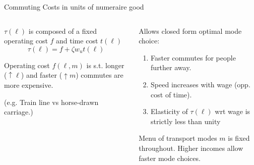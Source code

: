\documentclass[aspectratio=169]{beamer}
\begin{document}
\begin{frame}{Commuting Costs in units of numeraire good}

\begin{columns}
\begin{column}{0.5\textwidth}
\begin{midi}
\item $\tau(\ell)$ is composed of a fixed operating cost $f$ and time cost $t(\ell)$
\begin{equation*}
\tau(\ell) = f + \zeta w_u t(\ell)
\end{equation*}
\item Operating cost $f(\ell,m)$ is s.t. longer ($\uparrow \ell$) and faster ($\uparrow m$) commutes are more expensive.
\item (e.g. Train line vs horse-drawn carriage.)
\end{midi}
\end{column}
\pause
\begin{column}{0.5\textwidth}
\begin{midi}
\item Allows closed form optimal mode choice:
\begin{enumerate}
\item Faster commutes for people further away.
\item Speed increases with wage (opp. cost of time).
\item Elasticity of $\tau(\ell)$ wrt wage is strictly less than unity%
\end{enumerate}
\item Menu of transport modes $m$ is fixed throughout. Higher incomes allow faster mode choices.
\end{midi}

\end{column}
\end{columns}

\end{frame}
\end{document}
